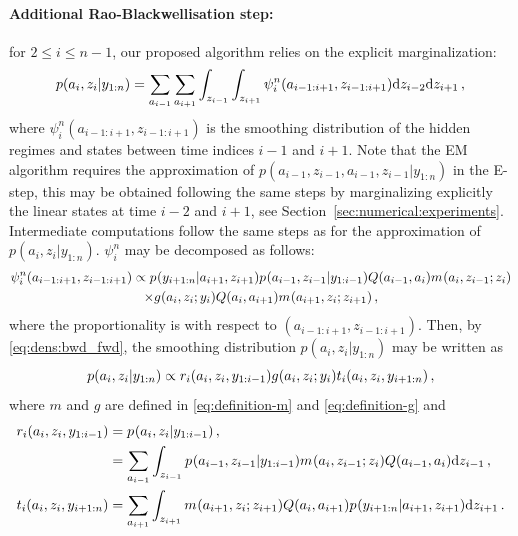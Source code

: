 \paragraph{Additional Rao-Blackwellisation step:}
for $2\le i \le n-1$, our proposed algorithm relies on the explicit marginalization:
\begin{equation}
\label{eq:dens:bwd_fwd}
p(a_{i},z_{i}|y_{1:n})  =  \sum_{a_{i-1}}\sum_{a_{i+1}} \int_{z_{i-1}} \int_{z_{i+1}} \psi^n_{i}(a_{i-1:i+1},z_{i-1:i+1})\mathrm{d} z_{i-2}\mathrm{d} z_{i+1}\,,
\end{equation}
where $\psi^n_{i}(a_{i-1:i+1},z_{i-1:i+1})$ is the smoothing distribution of the hidden regimes and states between time indices $i-1$ and $i+1$. Note that the EM algorithm requires the approximation of $p(a_{i-1},z_{i-1},a_{i-1},z_{i-1}|y_{1:n})$ in the E-step, this may be obtained following the same steps by marginalizing explicitly the linear states at time $i-2$ and $i+1$, see Section~\ref{sec:numerical:experiments}. Intermediate computations follow the same steps as  for the approximation of $p(a_{i},z_{i}|y_{1:n})$. $\psi^n_{i}$ may be decomposed as follows:
\begin{multline*}
\psi^n_{i}(a_{i-1:i+1},z_{i-1:i+1}) \propto p_{}(y_{i+1:n}|a_{i+1},z_{i+1})p_{}(a_{i-1},z_{i-1}|y_{1:i-1})Q(a_{i-1},a_{i})m_{}(a_{i},z_{i-1};z_{i})\\
\times g_{}(a_{i},z_{i};y_{i})Q(a_{i},a_{i+1})m_{}(a_{i+1},z_{i};z_{i+1})\,,
\end{multline*}
where the proportionality is with respect to $(a_{i-1:i+1},z_{i-1:i+1})$. Then, by \eqref{eq:dens:bwd_fwd}, the smoothing distribution $p(a_{i},z_{i}|y_{1:n}) $ may be written as
\begin{equation}
\label{eq:smoothing}
p(a_{i},z_{i}|y_{1:n})   \propto r_{i}(a_{i},z_{i},y_{1:i-1})g_{}(a_{i},z_{i};y_{i})t_{i}(a_i,z_i,y_{i+1:n})\,,
\end{equation}
where $m$ and $g$ are defined in \eqref{eq:definition-m} and \eqref{eq:definition-g} and
\begin{align}
r_{i}(a_{i},z_{i},y_{1:i-1}) &= p_{}(a_{i},z_{i}|y_{1:i-1})\,,\\
&=\sum_{a_{i-1}}\int_{z_{i-1}}p_{}(a_{i-1},z_{i-1}|y_{1:i-1})m_{}(a_{i},z_{i-1};z_{i})Q(a_{i-1},a_{i}) \mathrm{d} z_{i-1}\,,\label{eq:smooth:r}\\
t_{i}(a_i,z_i,y_{i+1:n}) &= \sum_{a_{i+1}}\int_{z_{i+1}}m_{}(a_{i+1},z_{i};z_{i+1})Q(a_{i},a_{i+1})p_{}(y_{i+1:n}|a_{i+1},z_{i+1}) \mathrm{d} z_{i+1}\,.\label{eq:smooth:t}
\end{align}
